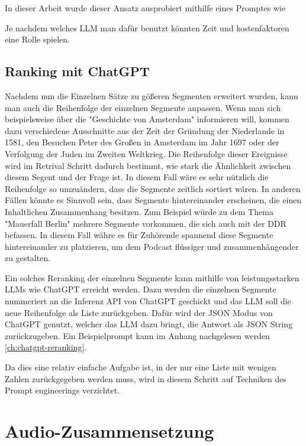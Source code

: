 In dieser Arbeit wurde dieser Ansatz ausprobiert mithilfe eines Promptes wie 

Je nachdem welches LLM man dafür benutzt könnten Zeit und kostenfaktoren eine Rolle spielen.


\subsection{Ranking mit ChatGPT}

Nachdem nun die Einzelnen Sätze zu gößeren Segmenten erweitert wurden, kann man auch die Reihenfolge der einzelnen Segmente anpassen.
Wenn man sich beispielsweise über die "Geschichte von Amsterdam" informieren will, kommen dazu verschiedene Ausschnitte aus der Zeit der Gründung der Niederlande in 1581, den Besuchen Peter des Großen in Amsterdam im Jahr 1697 oder der Verfolgung der Juden im Zweiten Weltkrieg.
Die Reihenfolge dieser Ereignisse wird im Retrival Schritt dadurch bestimmt, wie stark die Ähnlichkeit zwischen diesem Segent und der Frage ist.
In diesem Fall wäre es sehr nützlich die Reihenfolge so umzuändern, dass die Segmente zeitlich sortiert wären.
In anderen Fällen könnte es Sinnvoll sein, dass Segmente hintereinander erscheinen, die einen Inhaltlichen Zusammenhang besitzen.
Zum Beispiel würde zu dem Thema "Mauerfall Berlin" mehrere Segmente vorkommen, die sich auch mit der DDR befassen.
In diesem Fall währe es für Zuhörende spannend diese Segmente hintereinander zu platzieren, um dem Podcast flüssiger und zusammenhängender zu gestalten.

Ein solches Reranking der einzelnen Segmente kann mithilfe von leistungsstarken LLMs wie ChatGPT erreicht werden.
Dazu werden die einzelnen Segmente nummeriert an die Inferenz API von ChatGPT geschickt und das LLM soll die neue Reihenfolge als Liste zurückgeben.
Dafür wird der JSON Modus von ChatGPT genutzt, welcher das LLM dazu bringt, die Antwort als JSON String zurückzugeben.
Ein Beispielprompt kann im Anhang nachgelesen werden \autoref{ch:chatgpt-reranking}.

Da dies eine relativ einfache Aufgabe ist, in der nur eine Liste mit wenigen Zahlen zurückgegeben werden muss, wird in diesem Schritt auf Techniken des Prompt engineerings verzichtet.




\section{Audio-Zusammensetzung}


